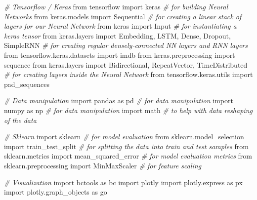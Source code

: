 \documentclass[
  a4paper,
  DIV=11,
  numbers=noendperiod]{scrreprt}
\newenvironment{Shaded}{\begin{snugshade}}{\end{snugshade}}
\newcommand{\CommentTok}[1]{\textcolor[rgb]{0.56,0.35,0.01}{\textit{#1}}}
\newcommand{\ImportTok}[1]{#1}
\newcommand{\NormalTok}[1]{#1}
\begin{document}
\begin{Shaded}
\begin{Highlighting}[numbers=left,,]

\CommentTok{\# Tensorflow / Keras}
\ImportTok{from}\NormalTok{ tensorflow }\ImportTok{import}\NormalTok{ keras }\CommentTok{\# for building Neural Networks}
\ImportTok{from}\NormalTok{ keras.models }\ImportTok{import}\NormalTok{ Sequential }\CommentTok{\# for creating a linear stack of layers for our Neural Network}
\ImportTok{from}\NormalTok{ keras }\ImportTok{import}\NormalTok{ Input }\CommentTok{\# for instantiating a keras tensor}
\ImportTok{from}\NormalTok{ keras.layers }\ImportTok{import}\NormalTok{ Embedding, LSTM, Dense, Dropout, SimpleRNN }\CommentTok{\# for creating regular densely{-}connected NN layers and RNN layers}
\ImportTok{from}\NormalTok{ tensorflow.keras.datasets }\ImportTok{import}\NormalTok{ imdb}
\ImportTok{from}\NormalTok{ keras.preprocessing }\ImportTok{import}\NormalTok{ sequence}
\ImportTok{from}\NormalTok{ keras.layers }\ImportTok{import}\NormalTok{ Bidirectional, RepeatVector, TimeDistributed }\CommentTok{\# for creating layers inside the Neural Network}
\ImportTok{from}\NormalTok{ tensorflow.keras.utils }\ImportTok{import}\NormalTok{ pad\_sequences}

\CommentTok{\# Data manipulation}
\ImportTok{import}\NormalTok{ pandas }\ImportTok{as}\NormalTok{ pd }\CommentTok{\# for data manipulation}
\ImportTok{import}\NormalTok{ numpy }\ImportTok{as}\NormalTok{ np }\CommentTok{\# for data manipulation}
\ImportTok{import}\NormalTok{ math }\CommentTok{\# to help with data reshaping of the data}

\CommentTok{\# Sklearn}
\ImportTok{import}\NormalTok{ sklearn }\CommentTok{\# for model evaluation}
\ImportTok{from}\NormalTok{ sklearn.model\_selection }\ImportTok{import}\NormalTok{ train\_test\_split }\CommentTok{\# for splitting the data into train and test samples}
\ImportTok{from}\NormalTok{ sklearn.metrics }\ImportTok{import}\NormalTok{ mean\_squared\_error }\CommentTok{\# for model evaluation metrics}
\ImportTok{from}\NormalTok{ sklearn.preprocessing }\ImportTok{import}\NormalTok{ MinMaxScaler }\CommentTok{\# for feature scaling}

\CommentTok{\# Visualization}
\ImportTok{import}\NormalTok{ bctools }\ImportTok{as}\NormalTok{ bc}
\ImportTok{import}\NormalTok{ plotly}
\ImportTok{import}\NormalTok{ plotly.express }\ImportTok{as}\NormalTok{ px}
\ImportTok{import}\NormalTok{ plotly.graph\_objects }\ImportTok{as}\NormalTok{ go}
\end{Highlighting}
\end{Shaded}
\end{document}
